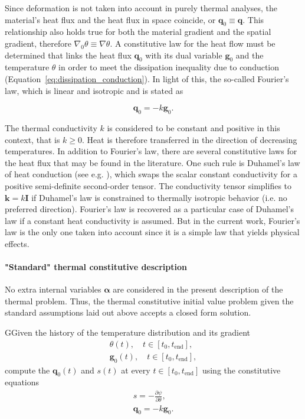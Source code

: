 Since deformation is not taken into account in purely thermal analyses, the material's heat flux and the heat flux in space coincide, or \(\bm q_0 \equiv \bm q\).
This relationship also holds true for both the material gradient and the spatial gradient, therefore \(\nabla_0 \theta \equiv \nabla \theta\).
A constitutive law for the heat flow must be determined that links the heat flux \(\bm q_0\) with its dual variable \(\bm g_0\) and the temperature \(\theta\) in order to meet the dissipation inequality due to conduction (Equation~\eqref{eq:dissipation_conduction}).
In light of this, the so-called Fourier's law, which is linear and isotropic and is stated as
\begin{highlight}
\begin{equation} \label{eq:def_fourier_law}
  \bm q_0=-k \bm g_0.
\end{equation}
\end{highlight}
The thermal conductivity \(k\) is considered to be constant and positive in this context, that is \(k \geq 0\).
Heat is therefore transferred in the direction of decreasing temperatures.
In addition to Fourier's law, there are several constitutive laws for the heat flux that may be found in the literature.
One such rule is Duhamel's law of heat conduction (see e.g. \cite{holzapfel_nonlinear_2000}), which swaps the scalar constant conductivity for a positive semi-definite second-order tensor.
The conductivity tensor simplifies to \(\bm k=k \bm I\) if Duhamel's law is constrained to thermally isotropic behavior (i.e. no preferred direction).
Fourier's law is recovered as a particular case of Duhamel's law if a constant heat conductivity is assumed.
But in the current work, Fourier's law is the only one taken into account since it is a simple law that yields physical effects.

\paragraph{"Standard" thermal constitutive description}
No extra internal variables \(\bm \alpha\) are considered in the present description of the thermal problem.
Thus, the thermal constitutive initial value problem given the standard assumptions laid out above accepts a closed form solution.

\begin{problem}
GGiven the history of the temperature distribution and its gradient
\begin{gather}
  \theta(t), \quad t\in [t_0, t_\text{end}],\\
  \bm g_0(t), \quad t \in [t_0, t_\text{end}],
\end{gather}
compute the $\bm q_0(t)$ and \(s(t)\) at every $t\in [t_0, t_\text{end}]$ using the constitutive equations
\begin{gather}
    s = - \frac{\partial \psi}{\partial \theta},\\
    \bm q_0 = -k\bm g_0.
\end{gather}
\end{problem}

